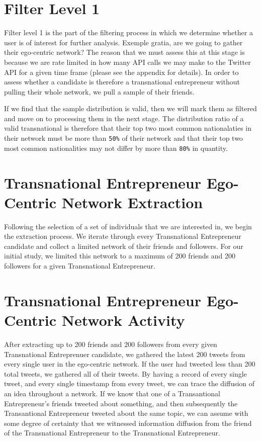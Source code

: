 \section{Filter Level 1}
Filter level 1 is the part of the filtering process in which we
determine whether a user is of interest for further analysis. Exemple
gratia, are we going to gather their ego-centric network? The reason
that we must assess this at this stage is because we are rate limited
in how many API calls we may make to the Twitter API for a given time
frame (please see the appendix for details). In order to assess
whether a candidate is therefore a transnational entrepreneur without
pulling their whole network, we pull a sample of their friends.

If we find that the sample distribution is valid, then we will mark
them as filtered and move on to processing them in the next stage. The
distribution ratio of a valid transnational is therefore that their
top two most common nationalaties in their network must be more than
\verb|50%| of their network and that their top two most common
nationalities may not differ by more than \verb|80%| in quantity.

\section{Transnational Entrepreneur Ego-Centric Network Extraction}
Following the selection of a set of individuals that we are interested
in, we begin the extraction process. We iterate through every
Transnational Entrepreneur candidate and collect a limited network of
their friends and followers. For our initial study, we limited this
network to a maximum of 200 friends and 200 followers for a given
Transnational Entrepreneur.

\section{Transnational Entrepreneur Ego-Centric Network Activity}
After extracting up to 200 friends and 200 followers from every given
Transnational Entreprenuer candidate, we gathered the latest 200
tweets from every single user in the ego-centric network. If the user
had tweeted less than 200 total tweets, we gathered all of their
tweets. By having a record of every single tweet, and every single
timestamp from every tweet, we can trace the diffusion of an idea
throughout a network. If we know that one of a Transantional
Entrepreneur's friends tweeted about something, and then subsequently
the Transantional Entrepreneur tweeted about the same topic, we can
assume with some degree of certainty that we witnessed information
diffusion from the friend of the Transnational Entrepreneur to the
Transnational Entrepreneur.

